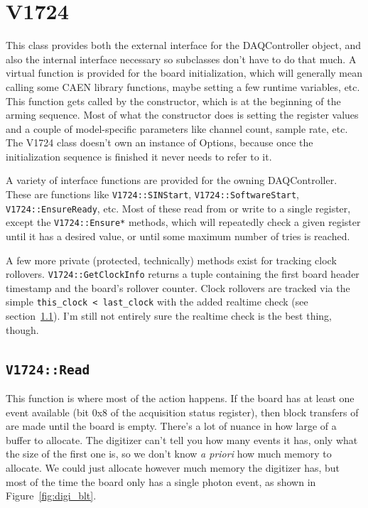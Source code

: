 \section{V1724}

This class provides both the external interface for the DAQController object, and also the internal interface necessary so subclasses don't have to do that much.
A virtual function is provided for the board initialization, which will generally mean calling some CAEN library functions, maybe setting a few runtime variables, etc.
This function gets called by the constructor, which is at the beginning of the arming sequence.
Most of what the constructor does is setting the register values and a couple of model-specific parameters like channel count, sample rate, etc.
The V1724 class doesn't own an instance of Options, because once the initialization sequence is finished it never needs to refer to it.

A variety of interface functions are provided for the owning DAQController.
These are functions like \texttt{V1724::SINStart}, \texttt{V1724::SoftwareStart}, \texttt{V1724::EnsureReady}, etc.
Most of these read from or write to a single register, except the \texttt{V1724::Ensure*} methods, which will repeatedly check a given register until it has a desired value, or until some maximum number of tries is reached.

A few more private (protected, technically) methods exist for tracking clock rollovers.
\texttt{V1724::GetClockInfo} returns a tuple containing the first board header timestamp and the board's rollover counter.
Clock rollovers are tracked via the simple \texttt{this\_clock < last\_clock} with the added realtime check (see section~\ref{}).
I'm still not entirely sure the realtime check is the best thing, though.

\subsection{\texttt{V1724::Read}}

This function is where most of the action happens.
If the board has at least one event available (bit 0x8 of the acquisition status register), then block transfers of are made until the board is empty.
There's a lot of nuance in how large of a buffer to allocate.
The digitizer can't tell you how many events it has, only what the size of the first one is, so we don't know \emph{a priori} how much memory to allocate.
We could just allocate however much memory the digitizer has, but most of the time the board only has a single photon event, as shown in Figure~\ref{fig:digi_blt}.


